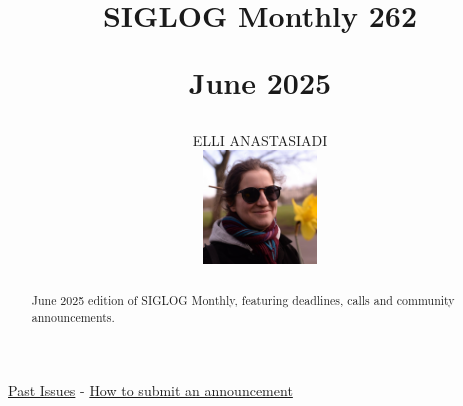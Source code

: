 \documentclass[prodmode,acmtecs]{acmsmall} %
\newcounter{colstart}
\begin{document}
\setcounter{colstart}{\thepage}

\title{{\huge\sc SIGLOG Monthly 262}

 June 2025}\author{ELLI ANASTASIADI\vspace*{-2.6cm}\begin{flushright}\includegraphics[width=30mm]{elli_anastasiadi.png}\end{flushright}}\begin{abstract}June 2025 edition of SIGLOG Monthly, featuring deadlines, calls and community announcements.
\end{abstract}


\maketitlee

\href{https://lics.siglog.org/newsletters/}{Past Issues}
 - 
\href{https://lics.siglog.org/newsletters/inst.html}{How to submit an announcement}
\end{document}
